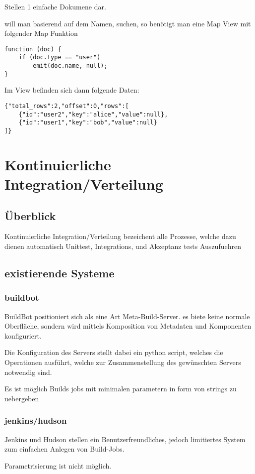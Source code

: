Stellen 1 einfache Dokumene dar.

will man basierend auf dem Namen, suchen, so benötigt man eine Map View mit folgender Map Funktion
\begin{lstlisting}
function (doc) {
    if (doc.type == "user")
        emit(doc.name, null);
}
\end{lstlisting}

Im View befinden sich dann folgende Daten:

\begin{lstlisting}
{"total_rows":2,"offset":0,"rows":[
    {"id":"user2","key":"alice","value":null},
    {"id":"user1","key":"bob","value":null}
]}
\end{lstlisting}



\section{Kontinuierliche Integration/Verteilung}

\subsection{Überblick}

Kontinuierliche Integration/Verteilung bezeichent alle Prozesse,
welche dazu dienen automatisch Unittest, Integrations, und Akzeptanz tests Auszufuehren


\subsection{existierende Systeme}

\subsubsection{buildbot}

BuildBot positioniert sich als eine Art Meta-Build-Server.
es biete keine normale Oberfläche, sondern wird mittels
Komposition von Metadaten und Komponenten konfiguriert.

Die Konfiguration des Servers stellt dabei ein python script,
welches die Operationen ausführt, welche zur Zusammenstellung des gewünschten Servers notwendig sind.

Es ist möglich Builds jobs mit minimalen parametern in form von strings zu uebergeben

\subsubsection{jenkins/hudson}

Jenkins und Hudson stellen ein Benutzerfreundliches,
jedoch limitiertes System zum einfachen Anlegen von Build-Jobs.

Parametrisierung ist nicht möglich.
